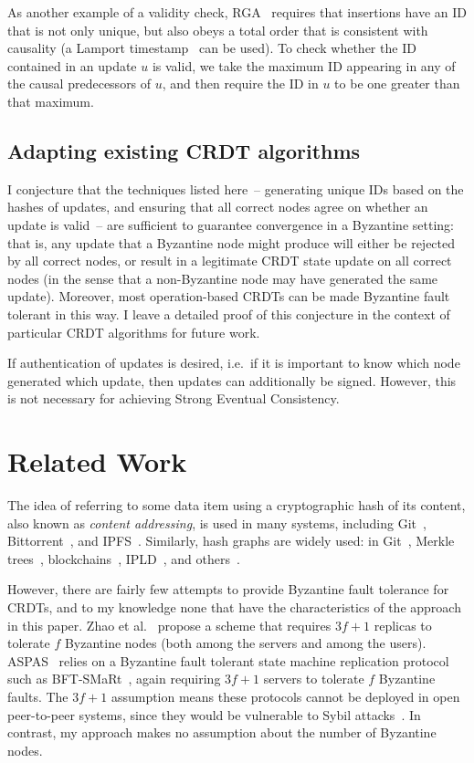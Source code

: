 \documentclass[sigplan,review]{acmart}
\begin{document}
As another example of a validity check, RGA~\cite{Roh:2011} requires that insertions have an ID that is not only unique, but also obeys a total order that is consistent with causality (a Lamport timestamp~\cite{Lamport:1978} can be used).
To check whether the ID contained in an update $u$ is valid, we take the maximum ID appearing in any of the causal predecessors of $u$, and then require the ID in $u$ to be one greater than that maximum.

\subsection{Adapting existing CRDT algorithms}

I conjecture that the techniques listed here~-- generating unique IDs based on the hashes of updates, and ensuring that all correct nodes agree on whether an update is valid~-- are sufficient to guarantee convergence in a Byzantine setting: that is, any update that a Byzantine node might produce will either be rejected by all correct nodes, or result in a legitimate CRDT state update on all correct nodes (in the sense that a non-Byzantine node may have generated the same update).
Moreover, most operation-based CRDTs can be made Byzantine fault tolerant in this way.
I leave a detailed proof of this conjecture in the context of particular CRDT algorithms for future work.

If authentication of updates is desired, i.e.\ if it is important to know which node generated which update, then updates can additionally be signed.
However, this is not necessary for achieving Strong Eventual Consistency.

\section{Related Work}\label{sec:relwork}

The idea of referring to some data item using a cryptographic hash of its content, also known as \emph{content addressing}, is used in many systems, including Git~\cite{ProGit}, Bittorrent~\cite{Pouwelse:2005}, and IPFS~\cite{Benet:2014}.
Similarly, hash graphs are widely used: in Git~\cite{ProGit}, Merkle trees~\cite{Merkle:1987}, blockchains~\cite{Baird:2016tq}, IPLD~\cite{IPLD}, and others~\cite{Kang:2003}.

However, there are fairly few attempts to provide Byzantine fault tolerance for CRDTs, and to my knowledge none that have the characteristics of the approach in this paper.
Zhao et al.~\cite{Zhao:2013ie,Zhao:2016,Chai:2014} propose a scheme that requires $3f+1$ replicas to tolerate $f$ Byzantine nodes (both among the servers and among the users).
ASPAS~\cite{Yactine:2021,Shoker:2017} relies on a Byzantine fault tolerant state machine replication protocol such as BFT-SMaRt~\cite{Bessani:2014}, again requiring $3f+1$ servers to tolerate $f$ Byzantine faults.
The $3f+1$ assumption means these protocols cannot be deployed in open peer-to-peer systems, since they would be vulnerable to Sybil attacks~\cite{Douceur:2002}.
In contrast, my approach makes no assumption about the number of Byzantine nodes.
\end{document}
